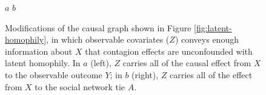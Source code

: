 \documentclass{article}
\begin{document}
\begin{multicols}{2}
\begin{figure}
\begin{center}
  $a$
  $b$
\end{center}
\caption{Modifications of the causal graph shown in Figure
  \ref{fig:latent-homophily}, in which observable covariates ($Z$) conveys
  enough information about $X$ that contagion effects are unconfounded with
  latent homophily.  In $a$ (left), $Z$ carries all of the causal effect from
  $X$ to the observable outcome $Y$; in $b$ (right), $Z$ carries all of the
  effect from $X$ to the social network tie $A$.}
  \label{fig:observable-control}
\end{figure}


\end{multicols}
\end{document}
